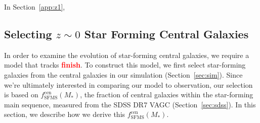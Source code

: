 \documentclass[12pt, letterpaper, preprint]{aastex}
\newcommand{\todo}[1]{{\bf \textcolor{red}{#1}}}
\begin{document}
In Section~\ref{app:z1}, 


\subsection{Selecting $z \sim 0$ Star Forming Central Galaxies}  
In order to examine the evolution of star-forming central galaxies, we require
a model that tracks \todo{finish}. 
To construct this model, we first select star-forming galaxies from
the central galaxies in our simulation (Section~\ref{sec:sim}). Since we're ultimately interested
in comparing our model to observation, our selection is
based on $f^\mathrm{cen}_\mathrm{SFMS}(M_*)$, the fraction of central 
galaxies within the star-forming main sequence, measured from the SDSS DR7 VAGC (Section~\ref{sec:sdss}).
In this section, we describe how we derive this $f^\mathrm{cen}_\mathrm{SFMS}(M_*)$. 
\end{document}
